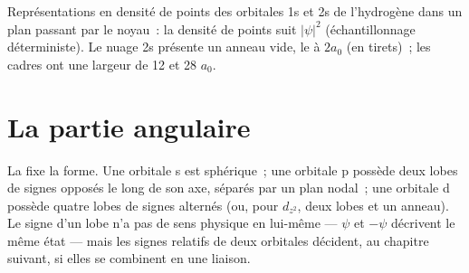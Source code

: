 \begin{omfigure}
\hspace{0.12\linewidth}%

{\small Représentations en densité de points des orbitales 1s et 2s de l'hydrogène dans un plan
passant par le noyau~: la densité de points suit $|\psi|^2$ (échantillonnage
déterministe). Le nuage 2s présente un anneau vide, le  à $2a_0$ (en tirets)~;
les cadres ont une largeur de 12 et 28 $a_0$.}
\end{omfigure}

\section{La partie angulaire}

La  fixe la forme. Une orbitale s est sphérique~; une orbitale p possède deux
lobes de signes opposés le long de son axe, séparés par un plan nodal~; une orbitale d possède
quatre lobes de signes alternés (ou, pour $d_{z^2}$, deux lobes et un anneau). Le signe
d'un lobe n'a pas de sens physique en lui-même --- $\psi$ et $-\psi$ décrivent le même
état --- mais les signes relatifs de deux orbitales décident, au chapitre suivant,
si elles se combinent en une liaison.

